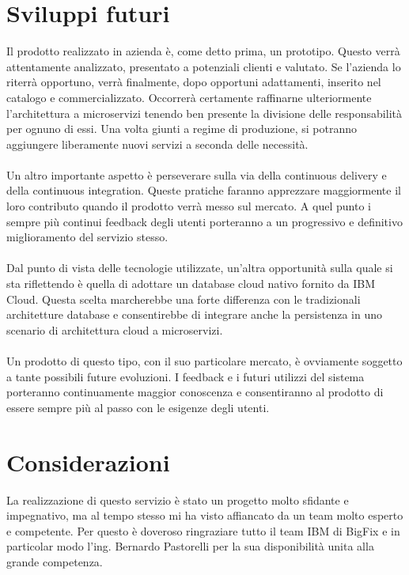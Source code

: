 \section{Sviluppi futuri}
Il prodotto realizzato in azienda è, come detto prima, un prototipo. Questo verrà attentamente analizzato, presentato a potenziali clienti e valutato. Se l'azienda lo riterrà opportuno, verrà finalmente, dopo opportuni adattamenti, inserito nel catalogo e commercializzato. Occorrerà certamente raffinarne ulteriormente l'architettura a microservizi tenendo ben presente la divisione delle responsabilità per ognuno di essi. Una volta giunti a regime di produzione, si potranno aggiungere liberamente nuovi servizi a seconda delle necessità.
\paragraph{}
Un altro importante aspetto è perseverare sulla via della continuous delivery e della continuous integration. Queste pratiche faranno apprezzare maggiormente il loro contributo quando il prodotto verrà messo sul mercato. A quel punto i sempre più continui feedback degli utenti porteranno a un progressivo e definitivo miglioramento del servizio stesso.
\paragraph{}
Dal punto di vista delle tecnologie utilizzate, un'altra opportunità sulla quale si sta riflettendo è quella di adottare un database cloud nativo fornito da IBM Cloud. Questa scelta marcherebbe una forte differenza con le tradizionali architetture database e consentirebbe di integrare anche la persistenza in uno scenario di architettura cloud a microservizi.
\paragraph{}
Un prodotto di questo tipo, con il suo particolare mercato, è ovviamente soggetto a tante possibili future evoluzioni. I feedback e i futuri utilizzi del sistema porteranno continuamente maggior conoscenza e consentiranno al prodotto di essere sempre più al passo con le esigenze degli utenti.

\section{Considerazioni}
La realizzazione di questo servizio è stato un progetto molto sfidante e impegnativo, ma al tempo stesso mi ha visto affiancato da un team molto esperto e competente. Per questo è doveroso ringraziare tutto il team IBM di BigFix e in particolar modo l'ing. Bernardo Pastorelli per la sua disponibilità unita alla grande competenza. 
